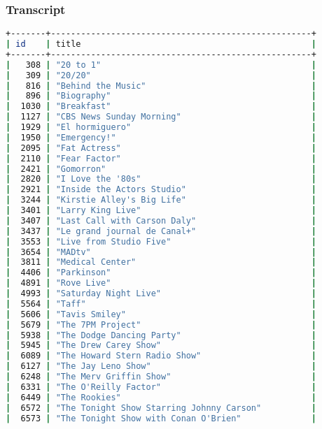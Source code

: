 \subsubsection{Transcript}
\begin{lstlisting}[language=bash]
+-------+----------------------------------------------------+
| id    | title                                              |
+-------+----------------------------------------------------+
|   308 | "20 to 1"                                          |
|   309 | "20/20"                                            |
|   816 | "Behind the Music"                                 |
|   896 | "Biography"                                        |
|  1030 | "Breakfast"                                        |
|  1127 | "CBS News Sunday Morning"                          |
|  1929 | "El hormiguero"                                    |
|  1950 | "Emergency!"                                       |
|  2095 | "Fat Actress"                                      |
|  2110 | "Fear Factor"                                      |
|  2421 | "Gomorron"                                         |
|  2820 | "I Love the '80s"                                  |
|  2921 | "Inside the Actors Studio"                         |
|  3244 | "Kirstie Alley's Big Life"                         |
|  3401 | "Larry King Live"                                  |
|  3407 | "Last Call with Carson Daly"                       |
|  3437 | "Le grand journal de Canal+"                       |
|  3553 | "Live from Studio Five"                            |
|  3654 | "MADtv"                                            |
|  3811 | "Medical Center"                                   |
|  4406 | "Parkinson"                                        |
|  4891 | "Rove Live"                                        |
|  4993 | "Saturday Night Live"                              |
|  5564 | "Taff"                                             |
|  5606 | "Tavis Smiley"                                     |
|  5679 | "The 7PM Project"                                  |
|  5938 | "The Dodge Dancing Party"                          |
|  5945 | "The Drew Carey Show"                              |
|  6089 | "The Howard Stern Radio Show"                      |
|  6127 | "The Jay Leno Show"                                |
|  6248 | "The Merv Griffin Show"                            |
|  6331 | "The O'Reilly Factor"                              |
|  6449 | "The Rookies"                                      |
|  6572 | "The Tonight Show Starring Johnny Carson"          |
|  6573 | "The Tonight Show with Conan O'Brien"              |

\end{lstlisting}
